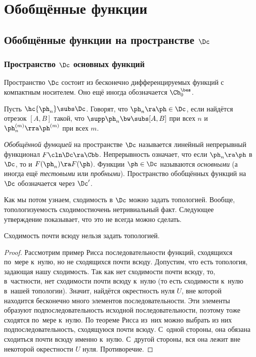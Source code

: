 \documentclass[a4paper]{article}
\begin{document}
\section{Обобщённые функции}

\subsection{Обобщённые функции на пространстве $\Dc$}

\subsubsection{Пространство $\Dc$ основных функций}

\begin{df}
Пространство $\Dc$ состоит из бесконечно дифференцируемых функций с компактным носителем.
Оно ещё иногда обозначается $\Cb^\bes_0$.
\end{df}

\begin{df}
Пусть $ \hc{\ph_n} \subs \Dc$. Говорят, что $\ph_n \ra \ph \in \Dc$, если найдётся отрезок $[A,B]$ такой,
что $\supp \ph_n \bw\subs [A,B]$ при всех $n$ и $\ph_n^{(m)} \rra \ph^{(m)}$ при всех $m$.
\end{df}

\begin{df}
\emph{Обобщённой функцией} на пространстве $\Dc$ называется линейный непрерывный функционал $F\cln \Dc \ra \Cbb$.
Непрерывность означает, что если $\ph_n \ra \ph$ в $\Dc$, то и $F(\ph_n) \ra F(\ph)$. Функции $\ph\in\Dc$
называются \emph{основными} (а иногда ещё \emph{тестовыми} или \emph{пробными}).
Пространство обобщённых функций на $\Dc$ обозначается через $\Dc'$.
\end{df}

Как мы потом узнаем, сходимость в $\Dc$ можно задать топологией. Вообще, топологизуемость сходимости\т очень
нетривиальный факт. Следующее утверждение показывает, что это не всегда можно сделать.

\begin{stm}
Сходимость почти всюду нельзя задать топологией.
\end{stm}
\begin{proof}
Рассмотрим пример Рисса последовательности функций, сходящихся по~мере к~нулю,
но не сходящихся почти всюду. Допустим, что есть топология, задающая нашу сходимость.
Так как нет сходимости почти всюду, то, в~частности, нет сходимости почти всюду к~нулю (то есть
сходимости к~нулю в~нашей топологии). Значит, найдётся окрестность нуля $U$,  вне которой находится
бесконечно много элементов последовательности. Эти элементы образуют подпоследовательность
исходной последовательности, поэтому тоже сходятся по~мере к~нулю. По теореме Рисса из~них можно выбрать
из них подпоследовательность, сходящуюся почти всюду. С~одной стороны, она обязана сходиться почти всюду
именно к~нулю. С~другой стороны, вся она лежит вне некоторой окрестности $U$ нуля. Противоречие.
\end{proof}
\end{document}
